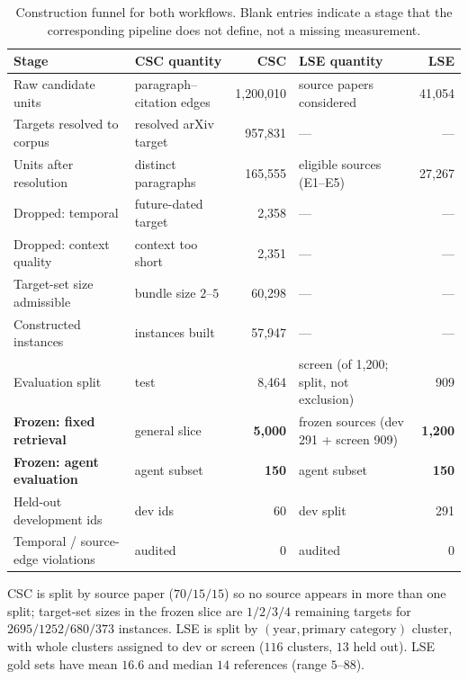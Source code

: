 \begin{table}[t]
\centering
\small
\caption{Construction funnel for both workflows. Blank entries indicate a stage that the
corresponding pipeline does not define, not a missing measurement.}
\label{tab:ar-funnel}
\begin{tabular}{llrlr}
\toprule
Stage & CSC quantity & CSC & LSE quantity & LSE \\
\midrule
Raw candidate units & paragraph--citation edges & 1{,}200{,}010 & source papers considered & 41{,}054 \\
Targets resolved to corpus & resolved arXiv target & 957{,}831 & --- & --- \\
Units after resolution & distinct paragraphs & 165{,}555 & eligible sources (E1--E5) & 27{,}267 \\
Dropped: temporal & future-dated target & 2{,}358 & --- & --- \\
Dropped: context quality & context too short & 2{,}351 & --- & --- \\
Target-set size admissible & bundle size $2$--$5$ & 60{,}298 & --- & --- \\
Constructed instances & instances built & 57{,}947 & --- & --- \\
Evaluation split & test & 8{,}464 & screen (of 1{,}200; split, not exclusion) & 909 \\
\textbf{Frozen: fixed retrieval} & general slice & \textbf{5{,}000} & frozen sources (dev 291 + screen 909) & \textbf{1{,}200} \\
\textbf{Frozen: agent evaluation} & agent subset & \textbf{150} & agent subset & \textbf{150} \\
Held-out development ids & dev ids & 60 & dev split & 291 \\
Temporal / source-edge violations & audited & 0 & audited & 0 \\
\bottomrule
\end{tabular}
\end{table}

CSC is split by source paper ($70/15/15$) so no source appears in more than one split; target-set
sizes in the frozen slice are $1/2/3/4$ remaining targets for $2695/1252/680/373$ instances.
LSE is split by $(\text{year}, \text{primary category})$ cluster, with whole clusters assigned to
dev or screen ($116$ clusters, $13$ held out). LSE gold sets have mean $16.6$ and median $14$
references (range $5$--$88$).


